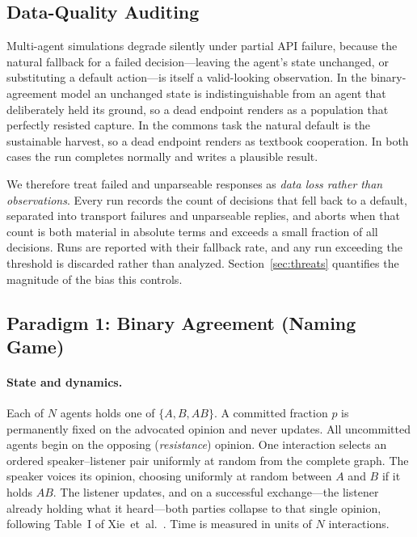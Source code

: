 \documentclass[manuscript,screen,review]{acmart}
\begin{document}
\subsection{Data-Quality Auditing}
\label{sec:methods-audit}
Multi-agent simulations degrade silently under partial API failure, because the
natural fallback for a failed decision---leaving the agent's state unchanged, or
substituting a default action---is itself a valid-looking observation. In the
binary-agreement model an unchanged state is indistinguishable from an agent that
deliberately held its ground, so a dead endpoint renders as a population that
perfectly resisted capture. In the commons task the natural default is the
sustainable harvest, so a dead endpoint renders as textbook cooperation. In both
cases the run completes normally and writes a plausible result.

We therefore treat failed and unparseable responses as \emph{data loss rather
than observations}. Every run records the count of decisions that fell back to a
default, separated into transport failures and unparseable replies, and aborts
when that count is both material in absolute terms and exceeds a small fraction
of all decisions. Runs are reported with their fallback rate, and any run
exceeding the threshold is discarded rather than analyzed. Section~\ref{sec:threats}
quantifies the magnitude of the bias this controls.

\subsection{Paradigm 1: Binary Agreement (Naming Game)}
\label{sec:methods-ng}
\paragraph{State and dynamics.} Each of $N$ agents holds one of
$\{A, B, AB\}$. A committed fraction $p$ is permanently fixed on the advocated
opinion and never updates. All uncommitted agents begin on the opposing
(\emph{resistance}) opinion. One interaction selects an ordered speaker--listener
pair uniformly at random from the complete graph. The speaker voices its opinion,
choosing uniformly at random between $A$ and $B$ if it holds $AB$. The listener
updates, and on a successful exchange---the listener already holding what it
heard---both parties collapse to that single opinion, following Table~I of
Xie~et~al.~\cite{xie2011}. Time is measured in units of $N$ interactions.
\end{document}
